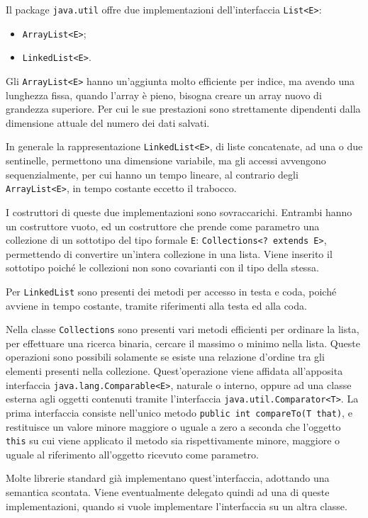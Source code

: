 \documentclass{article}
\numberwithin{equation}{subsection}
\begin{document}
Il package \verb|java.util| offre due implementazioni dell'interfaccia \verb|List<E>|:
\begin{itemize}
    \item \verb|ArrayList<E>|;
    \item \verb|LinkedList<E>|.
\end{itemize}
Gli \verb|ArrayList<E>| hanno un'aggiunta molto efficiente per indice, ma avendo una lunghezza fissa, quando l'array è pieno, bisogna creare un array nuovo di grandezza 
superiore. 
Per cui le sue prestazioni sono strettamente dipendenti dalla dimensione attuale del numero dei dati salvati. 


In generale la rappresentazione \verb|LinkedList<E>|, di liste concatenate, ad una o due sentinelle, permettono una dimensione variabile, ma gli accessi 
avvengono sequenzialmente, per cui hanno un tempo lineare, al contrario degli \verb|ArrayList<E>|, in tempo costante eccetto il trabocco. 


I costruttori di queste due implementazioni sono sovraccarichi. Entrambi hanno un costruttore vuoto, ed un costruttore che prende come parametro una collezione di un sottotipo 
del tipo formale \verb|E|: \verb|Collections<? extends E>|, permettendo di convertire un'intera collezione in una lista. Viene inserito il sottotipo poiché le collezioni 
non sono covarianti con il tipo della stessa. 


Per \verb|LinkedList| sono presenti dei metodi per accesso in testa e coda, poiché avviene in tempo costante, tramite riferimenti alla testa ed alla coda. 


Nella classe \verb|Collections| sono presenti vari metodi efficienti per ordinare la lista, per effettuare una ricerca binaria, cercare il massimo o minimo nella lista. 
Queste operazioni sono possibili solamente se esiste una relazione d'ordine tra gli elementi presenti nella collezione. 
Quest'operazione viene affidata all'apposita interfaccia \verb|java.lang.Comparable<E>|, naturale o interno, oppure ad una classe esterna agli oggetti contenuti tramite 
l'interfaccia \verb|java.util.Comparator<T>|. 
La prima interfaccia consiste nell'unico metodo \verb|public int compareTo(T that)|, e restituisce un valore minore maggiore o uguale a zero a seconda che l'oggetto 
\verb|this| su cui viene applicato il metodo sia rispettivamente minore, maggiore o uguale al riferimento all'oggetto ricevuto come parametro. 

Molte librerie standard già implementano quest'interfaccia, adottando una semantica scontata. Viene eventualmente delegato quindi ad una di queste implementazioni, quando si vuole 
implementare l'interfaccia su un altra classe. 
\end{document}
